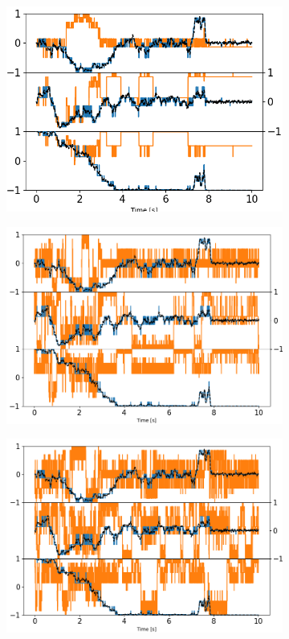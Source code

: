 \documentclass[final,  3p]{elsarticle}
\begin{document}
\begin{figure}[h]
	\centering
	\begin{subfigure}{0.32\textwidth}
		\subcaption{}
		\includegraphics[width=\textwidth]{./Images/fig10a.png}
	\end{subfigure}
	\begin{subfigure}{0.32\textwidth}
		\subcaption{}
		\includegraphics[width=\textwidth]{./Images/fig10b.png}
	\end{subfigure}
	\begin{subfigure}{0.32\textwidth}
		\subcaption{}
		\includegraphics[width=\textwidth]{./Images/fig10c.png}

\end{subfigure}
\end{figure}
\end{document}
